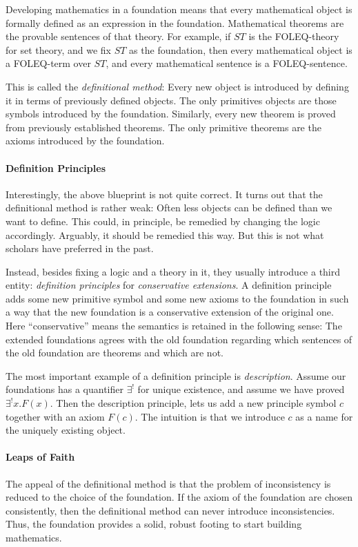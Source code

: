 Developing mathematics in a foundation means that every mathematical object is formally defined as an expression in the foundation. Mathematical theorems are the provable sentences of that theory. For example, if $ST$ is the FOLEQ-theory for set theory, and we fix $ST$ as the foundation, then every mathematical object is a FOLEQ-term over $ST$, and every mathematical sentence is a FOLEQ-sentence.

This is called the \emph{definitional method}: Every new object is introduced by defining it in terms of previously defined objects. The only primitives objects are those symbols introduced by the foundation. Similarly, every new theorem is proved from previously established theorems. The only primitive theorems are the axioms introduced by the foundation.

\paragraph{Definition Principles}
Interestingly, the above blueprint is not quite correct. It turns out that the definitional method is rather weak: Often less objects can be defined than we want to define. This could, in principle, be remedied by changing the logic accordingly. Arguably, it should be remedied this way. But this is not what scholars have preferred in the past.

Instead, besides fixing a logic and a theory in it, they usually introduce a third entity: \emph{definition principles} for \emph{conservative extensions}. A definition principle adds some new primitive symbol and some new axioms to the foundation in such a way that the new foundation is a conservative extension of the original one. Here ``conservative'' means the semantics is retained in the following sense: The extended foundations agrees with the old foundation regarding which sentences of the old foundation are theorems and which are not.

The most important example of a definition principle is \emph{description}. Assume our foundations has a quantifier $\exists^!$ for unique existence, and assume we have proved $\exists^! x.F(x)$. Then the description principle, lets us add a new principle symbol $c$ together with an axiom $F(c)$. The intuition is that 
we introduce $c$ as a name for the uniquely existing object.

\paragraph{Leaps of Faith}
The appeal of the definitional method is that the problem of inconsistency is reduced to the choice of the foundation. If the axiom of the foundation are chosen consistently, then the definitional method can never introduce inconsistencies. Thus, the foundation provides a solid, robust footing to start building mathematics.

